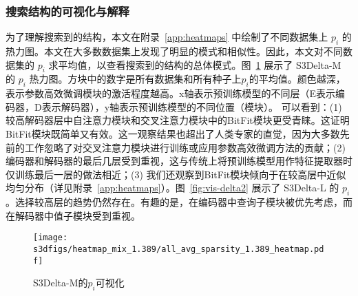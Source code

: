 \begin{table}[!htbp]
    \caption{搜索阶段和重新训练阶段的计算资源}
    \label{tab:computation}
    \centering
\end{table}

\subsubsection{搜索结构的可视化与解释}
\label{sec:vis}
为了理解搜索到的结构，本文在附录~\ref{app:heatmaps} 中绘制了不同数据集上 $p_i$ 的热力图。本文在大多数数据集上发现了明显的模式和相似性。因此，本文对不同数据集的 $p_i$ 求平均值，以查看搜索到的结构的总体模式。图~\ref{fig:visualization} 展示了 S3Delta-M 的 $p_i$ 热力图。方块中的数字是所有数据集和所有种子上$p_i$的平均值。颜色越深，表示参数高效微调模块的激活程度越高。x轴表示预训练模型的不同层（E表示编码器，D表示解码器），y轴表示预训练模型的不同位置（模块）。
可以看到：(1) 较高解码器层中自注意力模块和交叉注意力模块中的BitFit模块更受青睐。这证明BitFit模块既简单又有效。这一观察结果也超出了人类专家的直觉，因为大多数先前的工作忽略了对交叉注意力模块进行训练或应用参数高效微调方法的贡献；(2) 编码器和解码器的最后几层受到重视，这与传统上将预训练模型用作特征提取器时仅训练最后一层的做法相近；(3) 我们还观察到BitFit模块倾向于在较高层中近似均匀分布（详见附录~\ref{app:heatmaps}）。图~\ref{fig:vis-delta2} 展示了 S3Delta-L 的 $p_i$。选择较高层的趋势仍然存在。有趣的是，在编码器中查询子模块被优先考虑，而在解码器中值子模块受到重视。 

\begin{figure}[!htbp]
    \centering
    \texttt{[image: s3dfigs/heatmap\_mix\_1.389/all\_avg\_sparsity\_1.389\_heatmap.pdf]}
    \caption{S3Delta-M的$p_i$可视化}
    \label{fig:visualization}
\end{figure}

